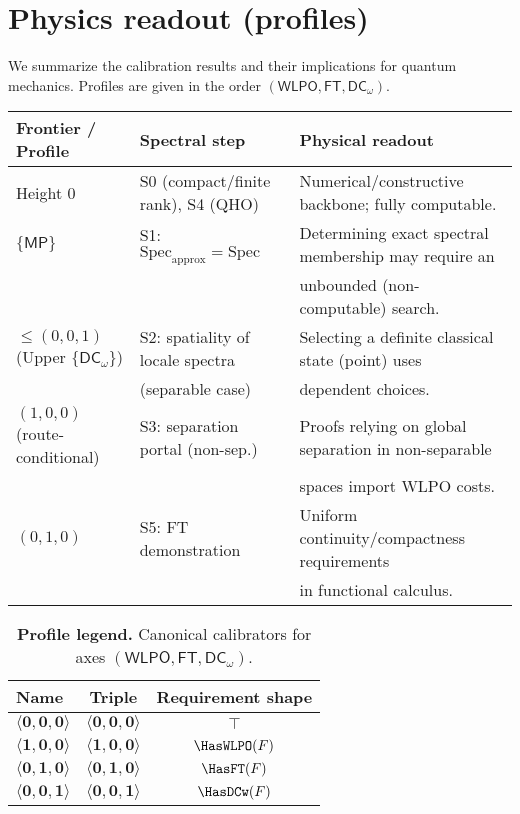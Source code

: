 \documentclass[11pt]{article}
\newcommand{\WLPO}{\mathsf{WLPO}}
\newcommand{\FT}{\mathsf{FT}}
\newcommand{\DCw}{\mathsf{DC}_{\omega}}
\newcommand{\MP}{\mathsf{MP}}
\newcommand{\hzero}{\mathbf{0}}
\newcommand{\hone}{\mathbf{1}}
\newcommand{\allzero}{\langle \hzero,\hzero,\hzero\rangle}
\newcommand{\WLPOonly}{\langle \hone,\hzero,\hzero\rangle}
\newcommand{\FTonly}{\langle \hzero,\hone,\hzero\rangle}
\newcommand{\DCwonly}{\langle \hzero,\hzero,\hone\rangle}
\theoremstyle{plain}
\theoremstyle{definition}
\theoremstyle{remark}
\begin{document}
\section{Physics readout (profiles)}

We summarize the calibration results and their implications for quantum mechanics. Profiles are given in the order $(\WLPO, \FT, \DCw)$.

\begin{center}
\begin{tabular}{|l|l|l|}
\hline
\textbf{Frontier / Profile} & \textbf{Spectral step} & \textbf{Physical readout} \\
\hline
Height $0$ & S0 (compact/finite rank), S4 (QHO) & Numerical/constructive backbone; fully computable. \\
\hline
$\{\MP\}$ & S1: $\mathrm{Spec}_{\mathrm{approx}}=\mathrm{Spec}$ & Determining exact spectral membership may require an \\
& & unbounded (non-computable) search. \\
\hline
$\le (0,0,1)$ (Upper $\{\DCw\}$) & S2: spatiality of locale spectra & Selecting a definite classical state (point) uses \\
& (separable case) & dependent choices. \\
\hline
$(1,0,0)$ (route-conditional) & S3: separation portal (non-sep.) & Proofs relying on global separation in non-separable \\
& & spaces import WLPO costs. \\
\hline
$(0,1,0)$ & S5: FT demonstration & Uniform continuity/compactness requirements \\
& & in functional calculus. \\
\hline
\end{tabular}
\end{center}

\begin{table}[t]
  \centering
  \setlength{\tabcolsep}{8pt}
  \renewcommand{\arraystretch}{1.15}
  \begin{tabular}{l c c}
  \hline
  Name & Triple & Requirement shape \\ \hline
  $\allzero$    & $\langle\hzero,\hzero,\hzero\rangle$ & $\top$ \\
  $\WLPOonly$   & $\langle\hone,\hzero,\hzero\rangle$  & $\HasWLPO(F)$ \\
  $\FTonly$     & $\langle\hzero,\hone,\hzero\rangle$  & $\HasFT(F)$ \\
  $\DCwonly$    & $\langle\hzero,\hzero,\hone\rangle$  & $\HasDCw(F)$ \\
  \hline
  \end{tabular}
  \caption{\textbf{Profile legend.} Canonical calibrators for axes $(\WLPO,\FT,\DCw)$.}
  \label{tab:profile-legend}
\end{table}
\end{document}
